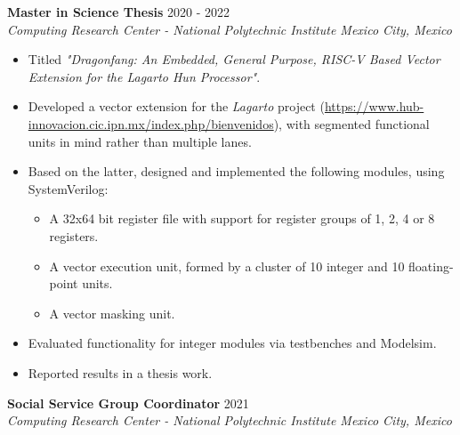 \documentclass[10pt]{article}
\begin{document}
	\noindent
	\textbf{Master in Science Thesis}
			\hfill 2020 - 2022 \\
	\textit{Computing Research Center - 
			National Polytechnic Institute
			\hfill Mexico City, Mexico}
	
	\vspace{2em}

	\begin{minipage}{5.5in}
		\begin{itemize}
			\item Titled \emph{"Dragonfang: An Embedded, General Purpose, RISC-V
				Based Vector Extension for the Lagarto Hun Processor"}.

			\item Developed a vector extension for the \emph{Lagarto} project
			(\url{https://www.hub-innovacion.cic.ipn.mx/index.php/bienvenidos}),
				with segmented functional units in mind rather than multiple
				lanes.

			\item Based on the latter, designed and implemented the following
				modules, using SystemVerilog:

				\begin{itemize}
					\item A 32x64 bit register file with support for
						register groups of 1, 2, 4 or 8 registers.

					\item A vector execution unit, formed by a cluster of 10
						integer and 10 floating-point units.

					\item A vector masking unit.
				\end{itemize}

			\item Evaluated functionality for integer modules via testbenches
				and Modelsim.

			\item Reported results in a thesis work.
		\end{itemize}
	\end{minipage}

	\newpage

	\noindent
	\textbf{Social Service Group Coordinator}
			\hfill 2021 \\
	\textit{Computing Research Center - 
			National Polytechnic Institute
			\hfill Mexico City, Mexico}
	
	\vspace{2em}
\end{document}
